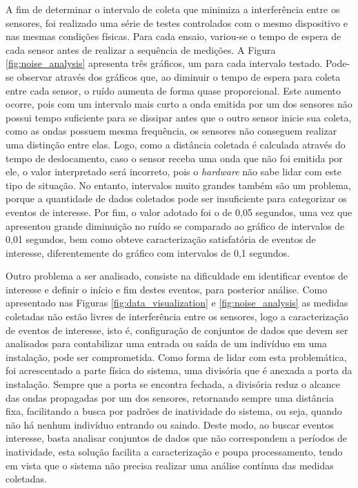 A fim de determinar o intervalo de coleta que minimiza a interferência entre os sensores, foi realizado uma série de testes controlados com o mesmo dispositivo e nas mesmas condições físicas. Para cada ensaio, variou-se o tempo de espera de cada sensor antes de realizar a sequência de medições. A Figura \ref{fig:noise_analysis} apresenta três gráficos, um para cada intervalo testado. Pode-se observar através dos gráficos que, ao diminuir o tempo de espera para coleta entre cada sensor, o ruído aumenta de forma quase proporcional. Este aumento ocorre, pois com um intervalo mais curto a onda emitida por um dos sensores não possui tempo suficiente para se dissipar antes que o outro sensor inicie sua coleta, como as ondas possuem mesma frequência, os sensores não conseguem realizar uma distinção entre elas. Logo, como a distância coletada é calculada através do tempo de deslocamento, caso o sensor receba uma onda que não foi emitida por ele, o valor interpretado será incorreto, pois o \textit{hardware} não sabe lidar com este tipo de situação. No entanto, intervalos muito grandes também são um problema, porque a quantidade de dados coletados pode ser insuficiente para categorizar os eventos de interesse. Por fim, o valor adotado foi o de 0,05 segundos, uma vez que apresentou grande diminuição no ruído se comparado ao gráfico de intervalos de 0,01 segundos, bem como obteve caracterização satisfatória de eventos de interesse, diferentemente do gráfico com intervalos de 0,1 segundos.

Outro problema a ser analisado, consiste na dificuldade em identificar eventos de interesse e definir o início e fim destes eventos, para posterior análise. Como apresentado nas Figuras \ref{fig:data_visualization} e \ref{fig:noise_analysis} as medidas coletadas não estão livres de interferência entre os sensores, logo a caracterização de eventos de interesse, isto é, configuração de conjuntos de dados que devem ser analisados para contabilizar uma entrada ou saída de um indivíduo em uma instalação, pode ser comprometida. Como forma de lidar com esta problemática, foi acrescentado a parte física do sistema, uma divisória que é anexada a porta da instalação. Sempre que a porta se encontra fechada, a divisória reduz o alcance das ondas propagadas por um dos sensores, retornando sempre uma distância fixa, facilitando a busca por padrões de inatividade do sistema, ou seja, quando não há nenhum indivíduo entrando ou saindo. Deste modo, ao buscar eventos interesse, basta analisar conjuntos de dados que não correspondem a períodos de inatividade, esta solução facilita a caracterização e poupa processamento, tendo em vista que o sistema não precisa realizar uma análise contínua das medidas coletadas.


